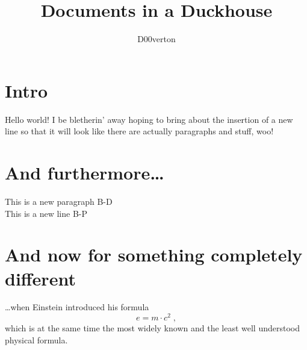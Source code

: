 \documentclass[titlepage]{article}
\title{Documents in a Duckhouse}
\author{D00verton}
\begin{document}
	\maketitle
	
	\tableofcontents
	
	\section{Intro}

	Hello world! I be bletherin' away hoping to bring about the insertion of a new line so that it will look like there are actually paragraphs and stuff, woo!
	
	\section{And furthermore\ldots }
	
	This is a new paragraph B-D\\This is a new line B-P
	
	\section{And now for something completely different}
	
	\ldots when Einstein introduced his formula
	\begin{equation}
	e = m \cdot c^2 \; ,
	\end{equation}
	which is at the same time the most widely known
	and the least well understood physical formula.
\end{document}
